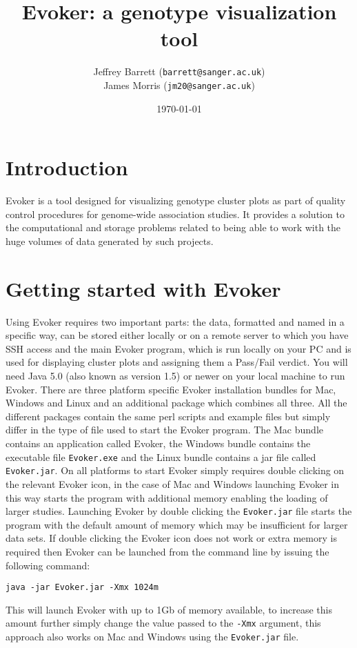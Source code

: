 \documentclass{article}
\title{Evoker: a genotype visualization tool}
\author{Jeffrey Barrett (\texttt{barrett@sanger.ac.uk})\\
James Morris (\texttt{jm20@sanger.ac.uk})}
\date{\today}
\begin{document}
\maketitle

\section{Introduction}

Evoker is a tool designed for visualizing genotype cluster plots as part of quality control procedures for genome-wide association studies. It provides a solution to the computational and storage problems related to being able to work with the huge volumes of data generated by such projects.

\section{Getting started with Evoker}

Using Evoker requires two important parts: the data, formatted and named in a specific way, can be stored either locally or on a remote server to which you have SSH access and the main Evoker program, which is run locally on your PC and is used for displaying cluster plots and assigning them a Pass/Fail verdict. You will need Java 5.0 (also known as version 1.5) or newer on your local machine to run Evoker. There are three platform specific Evoker installation bundles for Mac, Windows and Linux and an additional package which combines all three. All the different packages contain the same perl scripts and example files but simply differ in the type of file used to start the Evoker program. The Mac bundle contains an application called Evoker, the Windows bundle contains the executable file \texttt{Evoker.exe} and the Linux bundle contains a jar file called \texttt{Evoker.jar}. On all platforms to start Evoker simply requires double clicking on the relevant Evoker icon, in the case of Mac and Windows launching Evoker in this way starts the program with additional memory enabling the loading of larger studies. Launching Evoker by double clicking the \texttt{Evoker.jar} file starts the program with the default amount of memory which may be insufficient for larger data sets. If double clicking the Evoker icon does not work or extra memory is required then Evoker can be launched from the command line by issuing the following command:
\begin{verbatim}
java -jar Evoker.jar -Xmx 1024m 
\end{verbatim}
This will launch Evoker with up to 1Gb of memory available, to increase this amount further simply change the value passed to the \texttt{-Xmx} argument, this approach also works on Mac and Windows using the \texttt{Evoker.jar} file.
\end{document}
